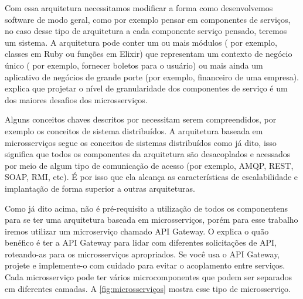 Com essa arquitetura necessitamos modificar a forma como desenvolvemos software de modo geral, como por exemplo pensar em componentes de serviços, no caso desse tipo de arquitetura a cada componente serviço pensado, teremos um sistema. A arquitetura pode conter um ou mais módulos ( por exemplo, classes em Ruby ou funções em Elixir) que representam um contexto de negócio único ( por exemplo, fornecer boletos para o usuário) ou mais ainda um aplicativo de negócios de grande porte (por exemplo, financeiro de uma empresa). \cite{Richards2015} explica que projetar o nível de granularidade dos componentes de serviço é um dos maiores desafios dos microsserviços.

Alguns conceitos chaves descritos por \cite{Richards2015} necessitam serem compreendidos, por exemplo os conceitos de sistema distribuídos. A arquitetura baseada em microsserviços segue os conceitos de sistemas distribuídos como já dito, isso significa que todos os componentes da arquitetura são desacoplados e acessados por meio de algum tipo de comunicação de acesso (por exemplo, AMQP, REST, SOAP, RMI, etc). É por isso que ela alcança as características de escalabilidade e implantação de forma superior a outras arquiteturas.


Como já dito acima, não é pré-requisito a utilização de todos os componentens para se ter uma arquitetura baseada em microsserviços, porém para esse trabalho iremos utilizar um microserviço chamado API Gateway. O \cite{Florez2016} explica o quão benéfico é ter a API Gateway para lidar com diferentes solicitações de API, roteando-as para os microsserviços apropriados. Se você usa o API Gateway, projete e implemente-o com cuidado para evitar o acoplamento entre serviços. Cada microsserviço pode ter vários microcomponentes que podem ser separados em diferentes camadas. A \ref{fig:microsserviços} mostra esse tipo de microsserviço.

